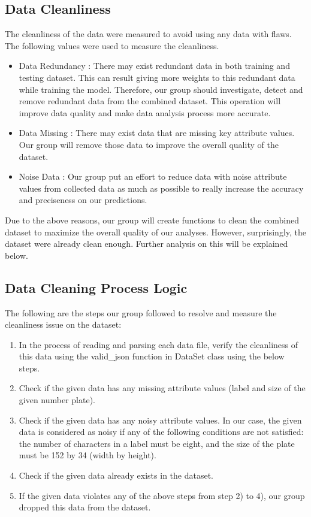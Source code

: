 \documentclass[conference]{IEEEtran}
\begin{document}
\subsection{Data Cleanliness}
The cleanliness of the data were measured to avoid using any data with flaws. The following values were used to measure the cleanliness.\\
\begin{itemize}
\item Data Redundancy : There may exist redundant data in both training and testing dataset. This can result giving more weights to this redundant data while training the model. Therefore, our group should investigate, detect and remove redundant data from the combined dataset. This operation will improve data quality and make data analysis process more accurate.
\item Data Missing : There may exist data that are missing key attribute values. Our group will remove those data to improve the overall quality of the dataset.
\item Noise Data : Our group put an effort to reduce data with noise attribute values from collected data as much as possible to really increase the accuracy and preciseness on our predictions.
\end{itemize}
Due to the above reasons, our group will create functions to clean the combined dataset to maximize the overall quality of our analyses. However, surprisingly, the dataset were already clean enough. Further analysis on this will be explained below.

\subsection{Data Cleaning Process Logic}
The following are the steps our group followed to resolve and measure the cleanliness issue on the dataset:\\
\begin{enumerate}
\item In the process of reading and parsing each data file, verify the cleanliness of this data using the valid\_json function in DataSet class using the below steps.
\item Check if the given data has any missing attribute values (label and size of the given number plate).
\item Check if the given data has any noisy attribute values. In our case, the given data is considered as noisy if any of the following conditions are not satisfied: the number of characters in a label must be eight, and the size of the plate must be 152 by 34 (width by height).
\item Check if the given data already exists in the dataset.
\item If the given data violates any of the above steps from step 2) to 4), our group dropped this data from the dataset.
\end{enumerate}
\raggedbottom
\end{document}
